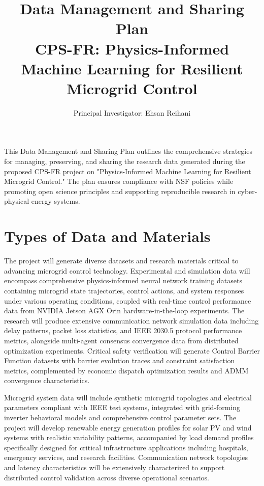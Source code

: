 \documentclass[12pt]{article}
\begin{document}
\title{\Large\textbf{Data Management and Sharing Plan\\CPS-FR: Physics-Informed Machine Learning for Resilient Microgrid Control}}
\author{Principal Investigator: Ehsan Reihani}
\date{}

\maketitle

This Data Management and Sharing Plan outlines the comprehensive strategies for managing, preserving, and sharing the research data generated during the proposed CPS-FR project on "Physics-Informed Machine Learning for Resilient Microgrid Control." The plan ensures compliance with NSF policies while promoting open science principles and supporting reproducible research in cyber-physical energy systems.

\section{Types of Data and Materials}

The project will generate diverse datasets and research materials critical to advancing microgrid control technology. Experimental and simulation data will encompass comprehensive physics-informed neural network training datasets containing microgrid state trajectories, control actions, and system responses under various operating conditions, coupled with real-time control performance data from NVIDIA Jetson AGX Orin hardware-in-the-loop experiments. The research will produce extensive communication network simulation data including delay patterns, packet loss statistics, and IEEE 2030.5 protocol performance metrics, alongside multi-agent consensus convergence data from distributed optimization experiments. Critical safety verification will generate Control Barrier Function datasets with barrier evolution traces and constraint satisfaction metrics, complemented by economic dispatch optimization results and ADMM convergence characteristics.

Microgrid system data will include synthetic microgrid topologies and electrical parameters compliant with IEEE test systems, integrated with grid-forming inverter behavioral models and comprehensive control parameter sets. The project will develop renewable energy generation profiles for solar PV and wind systems with realistic variability patterns, accompanied by load demand profiles specifically designed for critical infrastructure applications including hospitals, emergency services, and research facilities. Communication network topologies and latency characteristics will be extensively characterized to support distributed control validation across diverse operational scenarios.
\end{document}
